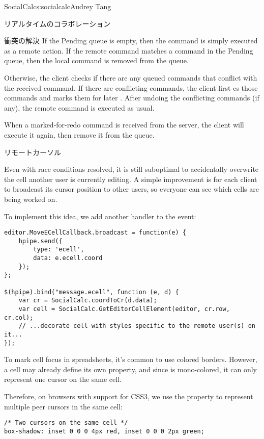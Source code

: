 \begin{aosachapter}{SocialCalc}{s:socialcalc}{Audrey Tang}
\begin{aosasect1}{リアルタイムのコラボレーション}
\begin{aosasect2}{衝突の解決}
If the Pending queue is empty, then the command is simply executed as a remote
action. If the remote command matches a command in the Pending queue, then the
local command is removed from the queue.

Otherwise, the client checks if there are any queued commands that conflict
with the received command.  If there are conflicting commands, the client first
es those commands and marks them for later .  After
undoing the conflicting commands (if any), the remote command is executed as
usual.

When a marked-for-redo command is received from the server, the client will
execute it again, then remove it from the queue.


\end{aosasect2}

\begin{aosasect2}{リモートカーソル}

Even with race conditions resolved, it is still suboptimal to
accidentally overwrite the cell another user is currently editing.  A
simple improvement is for each client to broadcast its cursor position
to other users, so everyone can see which cells are being worked on.

To implement this idea, we add another  handler to the
 event:

\begin{verbatim}
editor.MoveECellCallback.broadcast = function(e) {
    hpipe.send({
        type: 'ecell',
        data: e.ecell.coord
    });
};

$(hpipe).bind("message.ecell", function (e, d) {
    var cr = SocialCalc.coordToCr(d.data);
    var cell = SocialCalc.GetEditorCellElement(editor, cr.row, cr.col);
    // ...decorate cell with styles specific to the remote user(s) on it...
});
\end{verbatim}

To mark cell focus in spreadsheets, it's common to use colored
borders.  However, a cell may already define its own 
property, and since  is mono-colored, it can only
represent one cursor on the same cell.

Therefore, on browsers with support for CSS3, we use the 
property to represent multiple peer cursors in the same cell:

\begin{verbatim}
/* Two cursors on the same cell */
box-shadow: inset 0 0 0 4px red, inset 0 0 0 2px green;
\end{verbatim}


\end{aosasect2}
\end{aosasect1}
\end{aosachapter}
